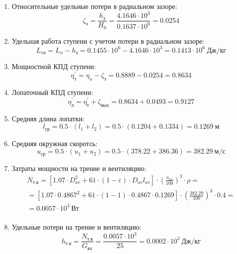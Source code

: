 \documentclass[a4paper,10pt]{article}
\begin{document}
\begin{enumerate}
        \item Относительные удельные потери в радиальном зазоре:
        \[
            \zeta_з = \frac{ h_з }{ H_0 } =
                \frac{ 4.1646 \cdot 10^3 }{ 0.1637 \cdot 10^6 } =
            0.0254
        \]

        \item Удельная работа ступени с учетом потери в радиальном зазоре:
        \[
            L_{uз} = L_u - h_з = 0.1455 \cdot 10^6 -
                4.1646 \cdot 10^3 =
            0.1413 \cdot 10^6 \ Дж/кг
        \]

        \item Мощностной КПД ступени:
        \[
            \eta_т^\prime = \eta_u - \zeta_з =
                0.8889 - 0.0254 = 0.8634
        \]

        \item Лопаточный КПД ступени:
        \[
            \eta_л^\prime = \eta_т^\prime + \zeta_{вых} =
                 0.8634 +  0.0493 =
            0.9127
        \]

        \item Средняя длина лопатки:
        \[
            l_{ср} = 0.5 \cdot (l_1 + l_2) =
                0.5 \cdot (0.1204 + 0.1334) =
            0.1269\ м
        \]

        \item Средняя окружная скоротсь:
        \[
            u_{ср} = 0.5 \cdot (u_1 + u_2) =
                0.5 \cdot (378.22 + 386.36) =
            382.29\ м/с
        \]

        \item Затраты мощности на трение и вентиляцию:
        \begin{gather*}
            N_{т.в} = \left[
                    1.07 \cdot D_{av}^2 + 61 \cdot (1 - \varepsilon) \cdot D_{av} l_{av}
            \right] \cdot
            \left(
                \frac{ u_{av} }{ 100 }
            \right) ^ 3 \cdot
            \rho =\\
            = \left[
                1.07 \cdot 0.4867^2 +
                61 \cdot (1 - 1) \cdot
                0.4867 \cdot 0.1269
            \right] \cdot
            \left(
                \frac{ 382.29 }{ 100 }
            \right) ^ 3 \cdot
            0.4=\\
            = 0.0057 \cdot 10^3 \ Вт \\
        \end{gather*}

        \item Удельные потери на трение и вентиляцию:
        \[
            h_{т.в} = \frac{ N_{т.в} }{ G_{вх} } =
                \frac{
                    0.0057 \cdot 10^3
                }{
                    25
                }
            = 0.0002 \cdot 10^3 \ Дж/кг
        \]


\end{enumerate}
\end{document}

